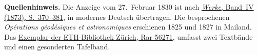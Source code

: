 \par\medskip\begin{small}\noindent\textbf{Quellenhinweis.} Die Anzeige vom 27.~Februar 1830 ist nach \href{https://gdz.sub.uni-goettingen.de/id/PPN236005081}{\textit{Werke}, Band~IV (1873), S.~370--381}, in modernes Deutsch übertragen. Die besprochenen \textit{Opérations géodésiques et astronomiques} erschienen 1825 und 1827 in Mailand. Das \href{https://doi.org/10.3931/e-rara-139800}{Exemplar der ETH-Bibliothek Zürich, Rar 56271}, umfasst zwei Textbände und einen gesonderten Tafelband.\par\end{small}
